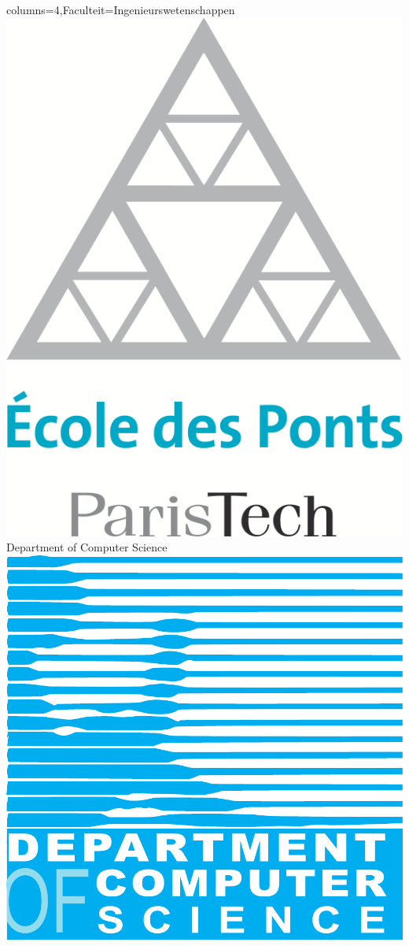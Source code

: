 \documentclass[portrait,a1paper,fontscale=0.45]{kuleuvenposter}
\begin{document}
\begin{poster}{columns=4,Faculteit=Ingenieurswetenschappen}
{  \includegraphics[height=.8\footerheight]{specific/logo_EcolePonts} %
}
{ %
  Department of Computer Science%
}
{ %
  \includegraphics[height=\footerheight]{images/logo_CS}%
}


\end{poster}
\end{document}

